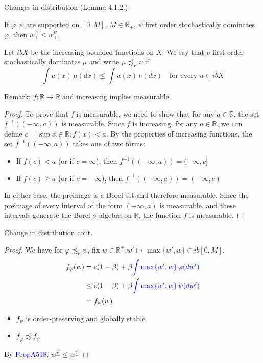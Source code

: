 \begin{frame}{Changes in distribution (Lemma 4.1.2.)}
\begin{lemma}
    If $\varphi,\psi$ are supported on $[0,M]$, $M\in\mathbb{R_+}$, $\psi$ first order stochastically dominates $\varphi$, then $w_\top^\varphi\le w_\top^\psi$.
\end{lemma}
\begin{definition}
    Let $ibX$ be the increasing bounded  functions on $X$. We say that $\nu$ first order stochastically dominates $\mu$ and write $\mu\precsim_F \nu$ if 
    $$
    \int u(x)\,\mu(dx)\le \int u(x)\,\nu(dx)\quad\text{for every $u\in ibX$}
    $$
\end{definition}
    
\end{frame}
\begin{frame}{Remark: $f:\mathbb{R}\to\mathbb{R}$ and increasing implies measurable}
    \begin{proof}
        To prove that $f$ is measurable, we need to show that for any $a \in \mathbb{R}$, the set $f^{-1}((-\infty, a))$ is measurable.
Since $f$ is increasing, for any $a \in \mathbb{R}$, we can define $c = \sup{x \in \mathbb{R} : f(x) < a}$.
By the properties of increasing functions, the set $f^{-1}((-\infty, a))$ takes one of two forms:
\begin{itemize}
\item If $f(c) < a$ (or if $c = \infty$), then $f^{-1}((-\infty, a)) = (-\infty, c]$
\item If $f(c) \geq a$ (or if $c = -\infty$), then $f^{-1}((-\infty, a)) = (-\infty, c)$
\end{itemize}
In either case, the preimage is a Borel set and therefore measurable. Since the preimage of every interval of the form $(-\infty, a)$ is measurable, and these intervals generate the Borel $\sigma$-algebra on $\mathbb{R}$, the function $f$ is measurable.
    \end{proof}
\end{frame}

\begin{frame}{Change in distribution cont.}
\begin{proof}
     We have for $\varphi\precsim_F \psi$, fix $w\in\mathbb{R}^+$,$w'\mapsto \max\{w',w\}\in ib[0,M]$.
     \begin{align*}
         f_\varphi(w) &=  c(1-\beta)  + \beta\textcolor{blue}{\int\max\{w', w\}\,\varphi(dw')}\\
         &\le c(1-\beta)  + \beta\textcolor{blue}{\int\max\{w', w\}\,\psi(dw')}\\
         &=f_\psi(w)
     \end{align*}
    \begin{itemize}
        \item $f_\psi$ is order-preserving and globally stable
        \item $f_\varphi\precsim f_\psi$
    \end{itemize}
    By \textcolor{blue}{PropA518}, $w_\top^\varphi \le w_\top^\psi$
\end{proof}
    
    
\end{frame}





